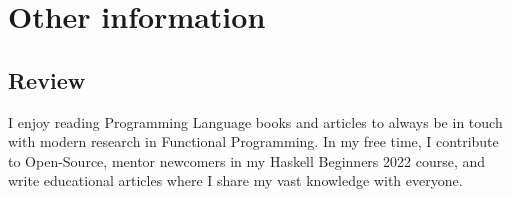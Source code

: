 \documentclass[letterpaper]{twentysecondcv} %
\begin{document}

\section{Other information}

\subsection{Review}

I enjoy reading Programming Language books and articles to always be in touch with modern research in Functional Programming. In my free time, I contribute to Open-Source, mentor newcomers in my Haskell Beginners 2022 course, and write educational articles where I share my vast knowledge with everyone.






\end{document}
